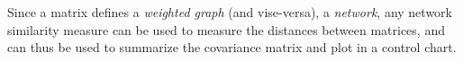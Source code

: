 %
%
%
%
%
%
%
%



\begin{extra}
Since a matrix defines a \emph{weighted graph} (and vise-versa), \aka a \emph{network}, any network similarity measure can be used to measure the distances between matrices, and can thus be used to summarize the covariance matrix and plot in a control chart.
\end{extra}







